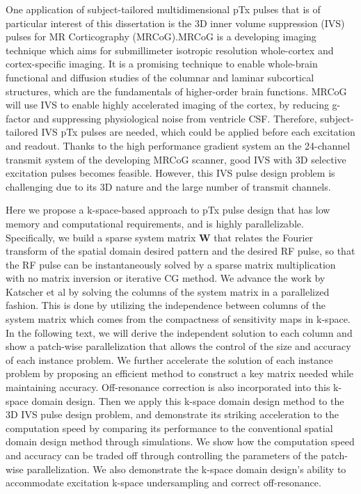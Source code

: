 \par One application of subject-tailored multidimensional pTx pulses that is of particular interest of this dissertation is the 3D inner volume suppression (IVS) pulses for MR Corticography (MRCoG).MRCoG is a developing imaging technique which aims for submillimeter isotropic resolution whole-cortex and cortex-specific imaging. 
It is a promising technique to enable whole-brain functional and diffusion studies of the columnar and laminar subcortical structures, which are the fundamentals of higher-order brain functions. 
MRCoG will use IVS to enable highly accelerated imaging of the cortex, by reducing g-factor and suppressing physiological noise from ventricle CSF. Therefore, subject-tailored IVS pTx pulses are needed, which could be applied before each excitation and readout. Thanks to the high performance gradient system an the 24-channel transmit system of the developing MRCoG scanner, good IVS with 3D selective excitation pulses becomes feasible. However, this IVS pulse design problem is challenging due to its 3D nature and the large number of transmit channels. 

\par Here we propose a k-space-based approach to pTx pulse design that has low memory and computational requirements, and is highly parallelizable. Specifically, we build a sparse system matrix $\mathbf{W}$ that relates the Fourier transform of the spatial domain desired pattern and the desired RF pulse, so that the RF pulse can be instantaneously solved by a sparse matrix multiplication with no matrix inversion or iterative CG method. We advance the work by Katscher et al \cite{katscher2003transmit} by solving the columns of the system matrix in a parallelized fashion. This is done by utilizing the independence between columns of the system matrix which comes from the compactness of sensitivity maps in k-space. In the following text, we will derive the independent solution to each column and show a patch-wise parallelization that allows the control of the size and accuracy of each instance problem. We further accelerate the solution of each instance problem by proposing an efficient method to construct a key matrix needed while maintaining accuracy. Off-resonance correction is also incorporated into this k-space domain design. Then we apply this k-space domain design method to the 3D IVS pulse design problem, and demonstrate its striking acceleration to the computation speed by comparing its performance to the conventional spatial domain design method through simulations. We show how the computation speed and accuracy can be traded off through controlling the parameters of the patch-wise parallelization. We also demonstrate the k-space domain design's ability to accommodate excitation k-space undersampling and correct off-resonance.  
